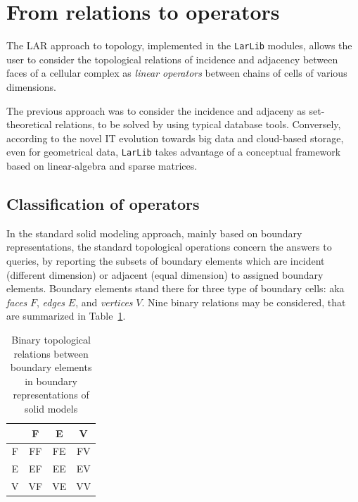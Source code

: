 \documentclass[11pt,oneside]{article}    %
\begin{document}
\section{From relations to operators}

The LAR approach to topology, implemented in the \texttt{LarLib} modules, allows the user to consider the topological relations of incidence and adjacency between faces of a cellular complex as \emph{linear operators} between chains of cells of various dimensions. 

The previous approach was to consider the incidence and adjaceny as set-theoretical relations, to be solved by using typical database tools. Conversely, according to the novel IT evolution towards big data and cloud-based storage, even for geometrical data, \texttt{LarLib}  takes advantage of a conceptual framework based on linear-algebra and sparse matrices.

\subsection{Classification of operators} 

In the standard solid modeling approach, mainly based on boundary representations, the standard topological operations concern the answers to queries, by reporting the subsets of boundary elements which are incident (different dimension) or adjacent (equal dimension) to assigned boundary elements. Boundary elements stand there for three type of boundary cells: aka \emph{faces} $F$, \emph{edges} $E$, and \emph{vertices} $V$. Nine binary relations may be considered, that are summarized in Table~\ref{tab:one}.
\begin{table}[htbp]
\caption{Binary topological relations between boundary elements in boundary representations of solid models}
\begin{center}
\begin{tabular}{|c|ccc|}
\hline 
  & F & E & V \\
\hline 
F & FF & FE & FV \\
E & EF & EE & EV \\
V & VF & VE & VV \\
\hline 
\end{tabular}
\end{center}
\label{tab:one}
\end{table}%
\end{document}
